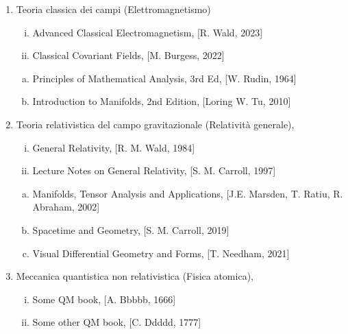 \begin{enumerate}[I]
\item Teoria classica dei campi (Elettromagnetismo)
\begin{enumerate}[(i)]
\item Advanced Classical Electromagnetism, [R. Wald, 2023]
\item Classical Covariant Fields, [M. Burgess, 2022]
\end{enumerate} 
\begin{enumerate}[(a)]
\item Principles of Mathematical Analysis, 3rd Ed, [W. Rudin, 1964]
\item Introduction to Manifolds, 2nd Edition, [Loring W. Tu, 2010]
\end{enumerate} 
\item Teoria relativistica del campo gravitazionale (Relatività generale),
\begin{enumerate}[(i)]
\item General Relativity, [R. M. Wald, 1984]
\item Lecture Notes on General Relativity, [S. M. Carroll, 1997]
\end{enumerate} 
\begin{enumerate}[(a)]
\item Manifolds, Tensor Analysis and Applications, [J.E. Marsden, T. Ratiu, R. Abraham, 2002] 
\item Spacetime and Geometry, [S. M. Carroll, 2019]
\item Visual Differential Geometry and Forms, [T. Needham, 2021]
\end{enumerate} 
\item Meccanica quantistica non relativistica (Fisica atomica),
\begin{enumerate}[(i)]
\item Some QM book, [A. Bbbbb, 1666]
\item Some other QM book, [C. Ddddd, 1777]
\end{enumerate} 

\end{enumerate}
